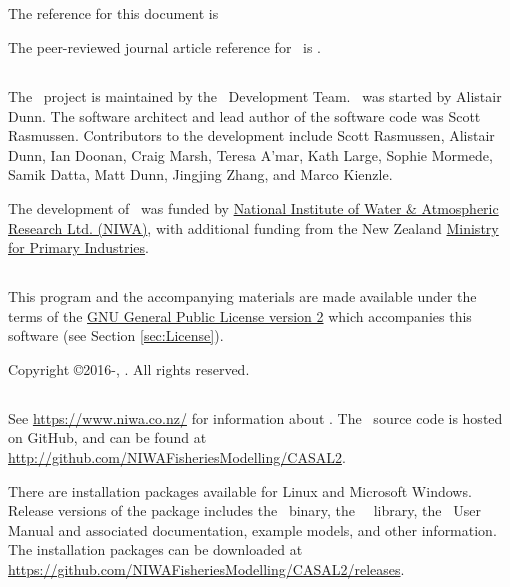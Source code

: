 \subsection{}

The reference for this document is \ManualRef

The peer-reviewed journal article reference for \CNAME\ is \citep{doonan_casal2}.

\subsection{}

The \CNAME\ project is maintained by the \CNAME\ Development Team. \CNAME\ was started by Alistair Dunn. The software architect and lead author of the software code was Scott Rasmussen. Contributors to the development include Scott Rasmussen, Alistair Dunn, Ian Doonan, Craig Marsh, Teresa A'mar, Kath Large, Sophie Mormede, Samik Datta, Matt Dunn, Jingjing Zhang, and Marco Kienzle.

The development of \CNAME\ was funded by \href{http://www.niwa.co.nz}{National Institute of Water \& Atmospheric Research Ltd. (NIWA)}, with additional funding from the New Zealand \href{http://www.mpi.govt.nz}{Ministry for Primary Industries}.

\subsection{}

This program and the accompanying materials are made available under the terms of the \href{http://www.opensource.org/licenses/GPL-2.0}{GNU General Public License version 2} which accompanies this software (see Section \ref{sec:License}).

Copyright \copyright 2016-\SourceControlYearDoc, \href{https://www.niwa.co.nz}{\Organisation}. All rights reserved.

\subsection{}

See \url{https://www.niwa.co.nz/} for information about \CNAME. The \CNAME\ source code is hosted on GitHub, and can be found at \url{http://github.com/NIWAFisheriesModelling/CASAL2}.

There are installation packages available for Linux and Microsoft Windows. Release versions of the package includes the \CNAME\ binary, the \CNAME\ \R\ library, the \CNAME\ User Manual and associated documentation, example models, and other information. The installation packages can be downloaded at \url{https://github.com/NIWAFisheriesModelling/CASAL2/releases}.

